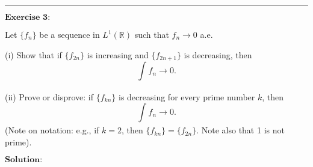 \documentclass[12pt]{article}
\begin{document}
\noindent\rule[0.25\baselineskip]{\textwidth}{0.5pt}

\vspace{8pt}

$\textbf{Exercise 3:}$

Let $\{f_{n}\}$ be a sequence in $L^{1}(\mathbb{R})$ such that $f_{n} \to 0$ a.e.

(i) Show that if $\{f_{2n}\}$ is increasing and $\{f_{2n + 1} \}$ is decreasing, then
\begin{equation*}
    \int_{}^{} f_{n} \to 0.
\end{equation*}

(ii) Prove or disprove: if $\{f_{kn} \}$ is decreasing for every prime number $k$, then 
\begin{equation*}
    \int_{}^{} f_{n} \to 0.
\end{equation*}
(Note on notation: e.g., if $k = 2$, then $\{f_{kn}\} = \{f_{2n}\}$. Note also that 1 is not prime).

\vspace{8pt}
$\textbf{Solution:}$
\end{document}
